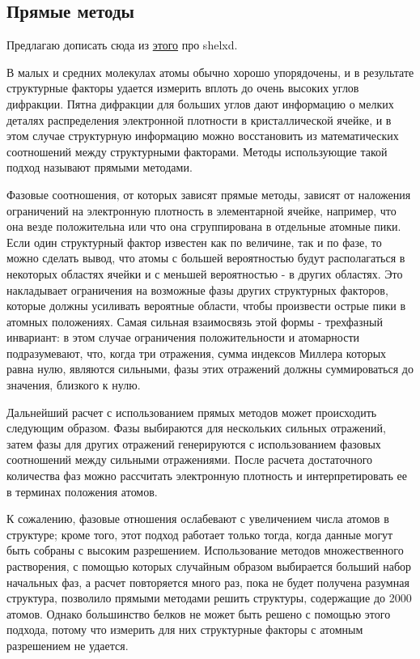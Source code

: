 \documentclass{article}
\begin{document}
\subsection{Прямые методы}

Предлагаю дописать сюда из \href{https://sci-hub.do/10.1007/0-387-33746-6}{этого} про shelxd.

В малых и средних молекулах атомы обычно хорошо упорядочены, и в результате структурные факторы удается измерить вплоть до очень высоких углов дифракции. Пятна дифракции для больших углов дают информацию о мелких деталях распределения электронной плотности в кристаллической ячейке, и в этом случае структурную информацию можно восстановить из математических соотношений между структурными факторами. Методы использующие такой подход называют прямыми методами.

Фазовые соотношения, от которых зависят прямые методы, зависят от наложения ограничений на электронную плотность в элементарной ячейке, например, что она везде положительна или что она сгруппирована в отдельные атомные пики. Если один структурный фактор известен как по величине, так и по фазе, то можно сделать вывод, что атомы с большей вероятностью будут располагаться в некоторых областях ячейки и с меньшей вероятностью - в других областях. Это накладывает ограничения на возможные фазы других структурных факторов, которые должны усиливать вероятные области, чтобы произвести острые пики в атомных положениях. Самая сильная взаимосвязь этой формы - трехфазный инвариант: в этом случае ограничения положительности и атомарности подразумевают, что, когда три отражения, сумма индексов Миллера которых равна нулю, являются сильными, фазы этих отражений должны суммироваться до значения, близкого к нулю\cite{ThreePhase}.

Дальнейший расчет с использованием прямых методов может происходить следующим образом. Фазы выбираются для нескольких сильных отражений, затем фазы для других отражений генерируются с использованием фазовых соотношений между сильными отражениями. После расчета достаточного количества фаз можно рассчитать электронную плотность и интерпретировать ее в терминах положения атомов.

К сожалению, фазовые отношения ослабевают с увеличением числа атомов в структуре; кроме того, этот подход работает только тогда, когда данные могут быть собраны с высоким разрешением. Использование методов множественного растворения, с помощью которых случайным образом выбирается больший набор начальных фаз, а расчет повторяется много раз, пока не будет получена разумная структура, позволило прямыми методами решить структуры, содержащие до 2000 атомов. Однако большинство белков не может быть решено с помощью этого подхода, потому что измерить для них структурные факторы с атомным разрешением не удается.
\end{document}

